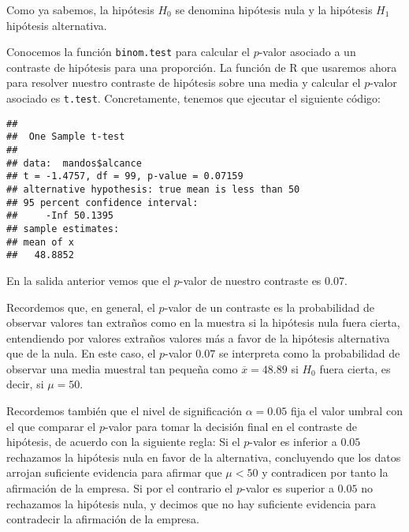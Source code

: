 \documentclass[
  degree=mecinf,
  title=normal,
  toc=normal,
  bib=normal]{mnye}
\newenvironment{Shaded}{\begin{snugshade}}{\end{snugshade}}
\newcommand{\AttributeTok}[1]{\textcolor[rgb]{0.77,0.63,0.00}{#1}}
\newcommand{\DecValTok}[1]{\textcolor[rgb]{0.00,0.00,0.81}{#1}}
\newcommand{\FunctionTok}[1]{\textcolor[rgb]{0.00,0.00,0.00}{#1}}
\newcommand{\NormalTok}[1]{#1}
\newcommand{\SpecialCharTok}[1]{\textcolor[rgb]{0.00,0.00,0.00}{#1}}
\newcommand{\StringTok}[1]{\textcolor[rgb]{0.31,0.60,0.02}{#1}}
\begin{document}
Como ya sabemos, la hipótesis \(H_0\) se denomina hipótesis nula y la hipótesis \(H_1\) hipótesis alternativa.

Conocemos la función \texttt{binom.test} para calcular el \(p\)-valor asociado a un contraste de hipótesis para una proporción.
La función de \textsf{R} que usaremos ahora para resolver nuestro contraste de hipótesis sobre una media y calcular el \(p\)-valor asociado es \texttt{t.test}. Concretamente, tenemos que ejecutar el siguiente código:

\begin{Shaded}
\end{Shaded}

\begin{verbatim}
## 
##  One Sample t-test
## 
## data:  mandos$alcance
## t = -1.4757, df = 99, p-value = 0.07159
## alternative hypothesis: true mean is less than 50
## 95 percent confidence interval:
##     -Inf 50.1395
## sample estimates:
## mean of x 
##   48.8852
\end{verbatim}

En la salida anterior vemos que el \(p\)-valor de nuestro contraste es \(0.07\).

Recordemos que, en general, el \(p\)-valor de un contraste es la probabilidad de observar valores tan extraños como en la muestra si la hipótesis nula fuera cierta, entendiendo por valores extraños valores más a favor de la hipótesis alternativa que de la nula.
En este caso, el \(p\)-valor \(0.07\) se interpreta como la probabilidad de observar una media muestral tan pequeña como \(\overline{x}=48.89\) si \(H_0\) fuera cierta, es decir, si \(\mu=50\).

Recordemos también que el nivel de significación \(\alpha = 0.05\) fija el valor umbral con el que comparar el \(p\)-valor para tomar la decisión final en el contraste de hipótesis, de acuerdo con la siguiente regla:
Si el \(p\)-valor es inferior a \(0.05\) rechazamos la hipótesis nula en favor de la alternativa, concluyendo que los datos arrojan suficiente evidencia para afirmar que \(\mu<50\) y contradicen por tanto la afirmación de la empresa.
Si por el contrario el \(p\)-valor es superior a \(0.05\) no rechazamos la hipótesis nula, y decimos que no hay suficiente evidencia para contradecir la afirmación de la empresa.
\end{document}
